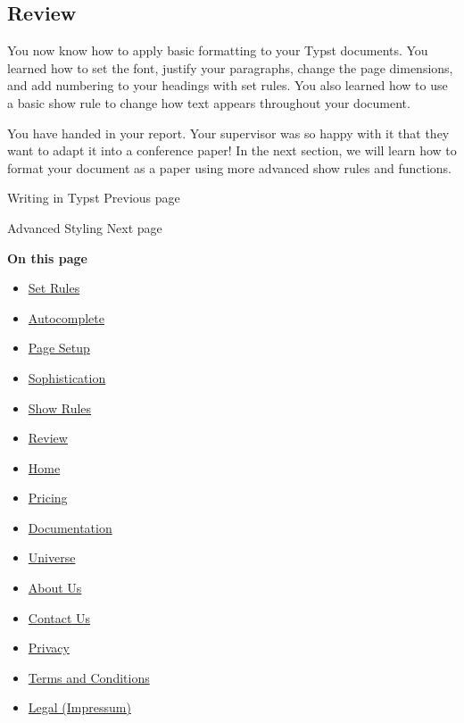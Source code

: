 \subsection{Review}\label{review}

You now know how to apply basic formatting to your Typst documents. You
learned how to set the font, justify your paragraphs, change the page
dimensions, and add numbering to your headings with set rules. You also
learned how to use a basic show rule to change how text appears
throughout your document.

You have handed in your report. Your supervisor was so happy with it
that they want to adapt it into a conference paper! In the next section,
we will learn how to format your document as a paper using more advanced
show rules and functions.

\href{/docs/tutorial/writing-in-typst/}{\pandocbounded{}}

{ Writing in Typst } { Previous page }

\href{/docs/tutorial/advanced-styling/}{\pandocbounded{}}

{ Advanced Styling } { Next page }

\textbf{On this page}

\begin{itemize}
\tightlist
\item
  \hyperref[set-rules]{Set Rules}
\item
  \hyperref[autocomplete]{Autocomplete}
\item
  \hyperref[page-setup]{Page Setup}
\item
  \hyperref[sophistication]{Sophistication}
\item
  \hyperref[show-rules]{Show Rules}
\item
  \hyperref[review]{Review}
\end{itemize}

\begin{itemize}
\tightlist
\item
  \href{/}{Home}
\item
  \href{/pricing/}{Pricing}
\item
  \href{/docs/}{Documentation}
\item
  \href{/universe/}{Universe}
\item
  \href{/about/}{About Us}
\item
  \href{/contact/}{Contact Us}
\item
  \href{/privacy/}{Privacy}
\item
  \href{https://typst.app/terms}{Terms and Conditions}
\item
  \href{/legal/}{Legal (Impressum)}
\end{itemize}

